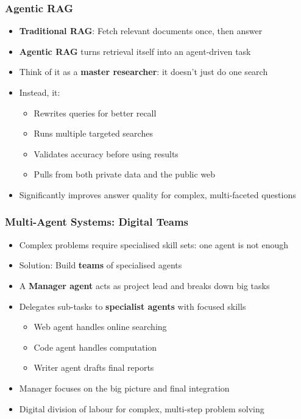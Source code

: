 \begin{frame}[fragile]\frametitle{Agentic RAG}
      \begin{itemize}
        \item \textbf{Traditional RAG}: Fetch relevant documents once, then answer
        \item \textbf{Agentic RAG} turns retrieval itself into an agent-driven task
        \item Think of it as a \textbf{master researcher}: it doesn't just do one search
        \item Instead, it:
        \begin{itemize}
            \item Rewrites queries for better recall
            \item Runs multiple targeted searches
            \item Validates accuracy before using results
            \item Pulls from both private data and the public web
        \end{itemize}
        \item Significantly improves answer quality for complex, multi-faceted questions
      \end{itemize}
\end{frame}

\begin{frame}[fragile]\frametitle{Multi-Agent Systems: Digital Teams}
      \begin{itemize}
        \item Complex problems require specialised skill sets: one agent is not enough
        \item Solution: Build \textbf{teams} of specialised agents
        \item A \textbf{Manager agent} acts as project lead and breaks down big tasks
        \item Delegates sub-tasks to \textbf{specialist agents} with focused skills
        \begin{itemize}
            \item Web agent handles online searching
            \item Code agent handles computation
            \item Writer agent drafts final reports
        \end{itemize}
        \item Manager focuses on the big picture and final integration
        \item Digital division of labour for complex, multi-step problem solving
      \end{itemize}
\end{frame}

